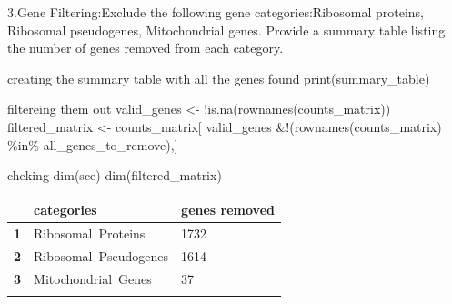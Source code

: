 \documentclass[
  ignorenonframetext,
]{beamer}
\begin{document}
\begin{frame}{3.Gene Filtering:Exclude the following gene
categories:Ribosomal proteins, Ribosomal pseudogenes, Mitochondrial
genes. Provide a summary table listing the number of genes removed from
each category.}
\begin{block}{creating the summary table with all the genes found}
print(summary\_table)
\end{block}

\begin{block}{filtereing them out}
\label{filtereing-them-out}
valid\_genes \textless- !is.na(rownames(counts\_matrix))
filtered\_matrix \textless- counts\_matrix{[} valid\_genes
\&!(rownames(counts\_matrix) \%in\% all\_genes\_to\_remove),{]}
\end{block}

\begin{block}{cheking}
\label{cheking}
dim(sce) dim(filtered\_matrix)

\begin{longtable}[]{@{}lll@{}}
\toprule\noalign{}
& categories & genes removed \\
\midrule\noalign{}
\endhead
\textbf{1} & Ribosomal~Proteins & 1732 \\
\textbf{2} & Ribosomal~Pseudogenes & 1614 \\
\textbf{3} & Mitochondrial~Genes & 37 \\
\bottomrule\noalign{}
\end{longtable}
\end{block}
\end{frame}
\end{document}
